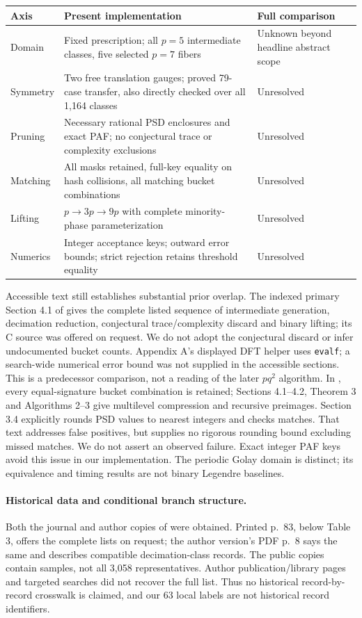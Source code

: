 \documentclass[11pt]{article}
\begin{document}
\begin{longtable}{p{.20\linewidth}p{.49\linewidth}p{.22\linewidth}}
\toprule
Axis & Present implementation & Full \cite{perera,pq2} comparison\\\midrule
\endhead
Domain & Fixed prescription; all $p=5$ intermediate classes, five selected
$p=7$ fibers & Unknown beyond headline abstract scope\\
Symmetry & Two free translation gauges; proved 79-case transfer, also
directly checked over all 1,164 classes & Unresolved\\
Pruning & Necessary rational PSD enclosures and exact PAF; no conjectural
trace or complexity exclusions & Unresolved\\
Matching & All masks retained, full-key equality on hash collisions,
all matching bucket combinations & Unresolved\\
Lifting & $p\to3p\to9p$ with complete minority-phase parameterization & Unresolved\\
Numerics & Integer acceptance keys; outward error bounds; strict rejection
retains threshold equality & Unresolved\\
\bottomrule
\end{longtable}

Accessible text still establishes substantial prior overlap. The indexed
primary Section 4.1 of \cite{issac} gives the complete listed sequence of
intermediate generation, decimation reduction, conjectural trace/complexity
discard and binary lifting; its C source was offered on request. We do not
adopt the conjectural discard or infer undocumented bucket counts. Appendix A's
displayed DFT helper uses \texttt{evalf}; a search-wide numerical error bound
was not supplied in the accessible sections. This is a predecessor comparison,
not a reading of the later $pq^2$ algorithm.
In \cite[Section 3.4, Algorithm 1]{lumsden}, every equal-signature bucket
combination is retained; Sections 4.1--4.2, Theorem 3 and Algorithms 2--3
give multilevel compression and recursive preimages. Section 3.4 explicitly
rounds PSD values to nearest integers and checks matches. That text addresses
false positives, but supplies no rigorous rounding bound excluding missed
matches. We do not assert an observed failure. Exact integer PAF keys avoid
this issue in our implementation. The periodic Golay domain is distinct;
its equivalence and timing results are not binary Legendre baselines.

\paragraph{Historical data and conditional branch structure.}
Both the journal and author copies of \cite{fletcher} were obtained.
Printed p.\ 83, below Table 3, offers the complete lists on request;
the author version's PDF p.\ 8 says the same and describes compatible
decimation-class records. The public copies contain samples, not all 3,058
representatives. Author publication/library pages and targeted searches did
not recover the full list. Thus no historical record-by-record crosswalk is
claimed, and our 63 local labels are not historical record identifiers.
\end{document}
